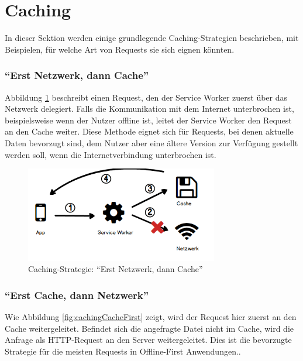 \documentclass[a4paper, 12pt]{scrreprt}
\begin{document}
\section{Caching}
In dieser Sektion werden einige grundlegende Caching-Strategien beschrieben, mit Beispielen, für welche Art von Requests sie sich eignen könnten.

\subsubsection{\enquote{Erst Netzwerk, dann Cache}}
Abbildung \ref{fig:cachingNetworkFirst} beschreibt einen Request, den der Service Worker zuerst über das Netzwerk delegiert. Falls die Kommunikation mit dem Internet unterbrochen ist, beispielsweise wenn der Nutzer offline ist, leitet der Service Worker den Request an den Cache weiter. Diese Methode eignet sich für Requests, bei denen aktuelle Daten bevorzugt sind, dem Nutzer aber eine ältere Version zur Verfügung gestellt werden soll, wenn die Internetverbindung unterbrochen ist.

\begin{figure}[H]
	\centering
	\includegraphics[width=0.75\textwidth]{networkfirst.png}
	\caption{Caching-Strategie: \enquote{Erst Netzwerk, dann Cache}}
	\label{fig:cachingNetworkFirst}
\end{figure}



\subsubsection{\enquote{Erst Cache, dann Netzwerk}}
\label{sec:cachedannnetzwerk}
Wie Abbildung \ref{fig:cachingCacheFirst} zeigt, wird der Request hier zuerst an den Cache weitergeleitet. Befindet sich die angefragte Datei nicht im Cache, wird die Anfrage als \ac{HTTP}-Request an den Server weitergeleitet. Dies ist die bevorzugte Strategie für die meisten Requests in Offline-First Anwendungen.\autocite[Kapitel 05]{BookBuildingPWAs}.
\end{document}
